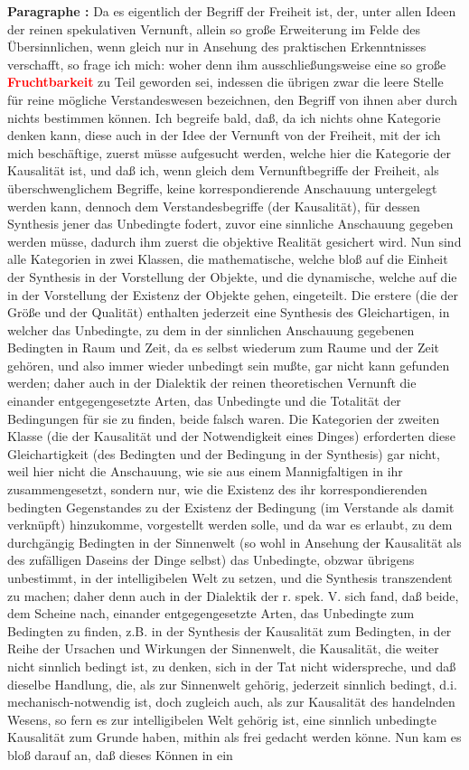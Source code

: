 \documentclass[a4paper,12pt,twoside]{book}
\newcommand{\match}[1]{\textcolor{red}{\textbf{#1}}}
\begin{document}
	\textbf{Paragraphe : }Da es eigentlich der Begriff der Freiheit ist, der, unter allen Ideen der reinen spekulativen Vernunft, allein so große Erweiterung im Felde des Übersinnlichen, wenn gleich nur in Ansehung des praktischen Erkenntnisses verschafft, so frage ich mich: woher denn ihm ausschließungsweise eine so große \match{Fruchtbarkeit} zu Teil geworden sei, indessen die übrigen zwar die leere Stelle für reine mögliche Verstandeswesen bezeichnen, den Begriff von ihnen aber durch nichts bestimmen können. Ich begreife bald, daß, da ich nichts ohne Kategorie denken kann, diese auch in der Idee der Vernunft von der Freiheit, mit der ich mich beschäftige, zuerst müsse aufgesucht werden, welche hier die Kategorie der Kausalität ist, und daß ich, wenn gleich dem Vernunftbegriffe der Freiheit, als überschwenglichem Begriffe, keine korrespondierende Anschauung untergelegt werden kann, dennoch dem Verstandesbegriffe (der Kausalität), für dessen Synthesis jener das Unbedingte fodert, zuvor eine sinnliche Anschauung gegeben werden müsse, dadurch ihm zuerst die objektive Realität gesichert wird. Nun sind alle Kategorien in zwei Klassen, die mathematische, welche bloß auf die Einheit der Synthesis in der Vorstellung der Objekte, und die dynamische, welche auf die in der Vorstellung der Existenz der Objekte gehen, eingeteilt. Die erstere (die der Größe und der Qualität) enthalten jederzeit eine Synthesis des Gleichartigen, in welcher das Unbedingte, zu dem in der sinnlichen Anschauung gegebenen Bedingten in Raum und Zeit, da es selbst wiederum zum Raume und der Zeit gehören, und also  immer wieder unbedingt sein mußte, gar nicht kann gefunden werden; daher auch in der Dialektik der reinen theoretischen Vernunft die einander entgegengesetzte Arten, das Unbedingte und die Totalität der Bedingungen für sie zu finden, beide falsch waren. Die Kategorien der zweiten Klasse (die der Kausalität und der Notwendigkeit eines Dinges) erforderten diese Gleichartigkeit (des Bedingten und der Bedingung in der Synthesis) gar nicht, weil hier nicht die Anschauung, wie sie aus einem Mannigfaltigen in ihr zusammengesetzt, sondern nur, wie die Existenz des ihr korrespondierenden bedingten Gegenstandes zu der Existenz der Bedingung (im Verstande als damit verknüpft) hinzukomme, vorgestellt werden solle, und da war es erlaubt, zu dem durchgängig Bedingten in der Sinnenwelt (so wohl in Ansehung der Kausalität als des zufälligen Daseins der Dinge selbst) das Unbedingte, obzwar übrigens unbestimmt, in der intelligibelen Welt zu setzen, und die Synthesis transzendent zu machen; daher denn auch in der Dialektik der r. spek. V. sich fand, daß beide, dem Scheine nach, einander entgegengesetzte Arten, das Unbedingte zum Bedingten zu finden, z.B. in der Synthesis der Kausalität zum Bedingten, in der Reihe der Ursachen und Wirkungen der Sinnenwelt, die Kausalität, die weiter nicht sinnlich bedingt ist, zu denken, sich in der Tat nicht widerspreche, und daß dieselbe Handlung, die, als zur Sinnenwelt gehörig, jederzeit sinnlich bedingt, d.i. mechanisch-notwendig ist, doch zugleich auch, als zur Kausalität des handelnden Wesens, so fern es zur intelligibelen Welt gehörig ist, eine sinnlich unbedingte Kausalität zum Grunde haben, mithin als frei gedacht werden könne. Nun kam es bloß darauf an, daß dieses Können in ein 
\end{document}
